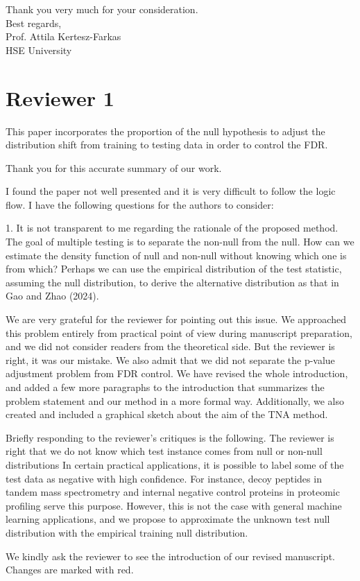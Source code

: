 \documentclass{article}
\newcommand{\response}[1]{\vspace*{1ex} \color{blue} \noindent #1 \color{black}
\vspace*{2ex}}
\begin{document}
Thank you very much for your consideration.\\[2ex]

\noindent
Best regards,\\[2ex]

\noindent
Prof. Attila Kertesz-Farkas\\
HSE University

\clearpage
\section*{Reviewer 1}

This paper incorporates the proportion of the null hypothesis to adjust the distribution shift from training to testing data in order to control the FDR. 

\response{Thank you for this accurate summary of our work.}

I found the paper not well presented and it is very difficult to follow the logic flow. I have the following questions for the authors to consider:

1. It is not transparent to me regarding the rationale of the proposed method. The goal of multiple testing is to separate the non-null from the null. How can we estimate the density function of null and non-null without knowing which one is from which? Perhaps we can use the empirical distribution of the test statistic, assuming the null distribution, to derive the alternative distribution as that in Gao and Zhao (2024).

\response{We are very grateful for the reviewer for pointing out this issue. We approached this problem entirely from practical point of view during manuscript preparation, and we did not consider readers from the theoretical side. But the reviewer is right, it was our mistake. We also admit that we did not separate the p-value adjustment problem from FDR control. We have revised the whole introduction, and added a few more paragraphs to the introduction that summarizes the problem statement and our method in a more formal way. Additionally, we also created and included a graphical sketch about the aim of the TNA method.
	
Briefly responding to the reviewer's critiques is the following. The reviewer is right that we do not know which test instance comes from null or non-null distributions  In certain practical applications, it is possible to label some of the test data as negative with high confidence. For instance, decoy peptides\cite{elias2007target} in tandem mass spectrometry and internal negative control proteins \cite{gao2023simultaneous} in proteomic profiling serve this purpose. However, this is not the case with general machine learning applications, and we propose to approximate the unknown test null distribution with the empirical training null distribution. 

We kindly ask the reviewer to see the introduction of  our revised manuscript. Changes are marked with red.}
\end{document}
